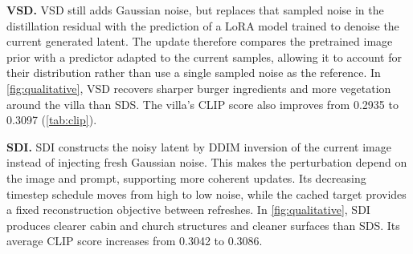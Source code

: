 \noindent\textbf{VSD.}
VSD still adds Gaussian noise, but replaces that sampled noise in the distillation residual with
the prediction of a LoRA model trained to denoise the current generated latent.
The update therefore compares the pretrained image prior with a predictor adapted to the current
samples, allowing it to account for their distribution rather than use a single sampled noise
as the reference.
In \cref{fig:qualitative}, VSD recovers sharper burger ingredients and more vegetation around the
villa than SDS.
The villa's CLIP score also improves from 0.2935 to 0.3097 (\cref{tab:clip}).

\noindent\textbf{SDI.}
SDI constructs the noisy latent by DDIM inversion of the current image instead of injecting fresh
Gaussian noise.
This makes the perturbation depend on the image and prompt, supporting more coherent updates.
Its decreasing timestep schedule moves from high to low noise, while the cached target provides
a fixed reconstruction objective between refreshes.
In \cref{fig:qualitative}, SDI produces clearer cabin and church structures and cleaner surfaces
than SDS.
Its average CLIP score increases from 0.3042 to 0.3086.